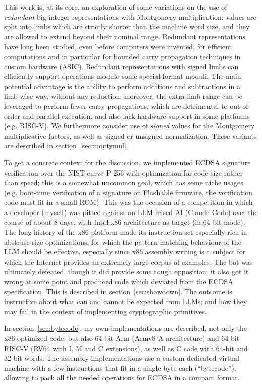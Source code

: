\documentclass{llncs}
\begin{document}
This work is, at its core, an exploration of some variations on the use
of \emph{redundant} big integer representations with Montgomery
multiplication: values are split into limbs which are strictly shorter
than the machine word size, and they are allowed to extend beyond their
nominal range. Redundant representations have long been studied, even
before computers were invented\cite{Col1726}, for efficient
computations\cite{Bri1983,Hon1989} and in particular for bounded carry
propagation techniques in custom hardware (ASIC)\cite{PhaKor1994}.
Redundant representations with signed limbs can efficiently support
operations modulo some special-format moduli\cite{Ber2006}. The main
potential advantage is the ability to perform additions and subtractions
in a limb-wise way, without any reduction; moreover, the extra limb
range can be leveraged to perform fewer carry propagations, which are
detrimental to out-of-order and parallel execution, and also lack
hardware support in some platforms (e.g. RISC-V). We furthermore
consider use of \emph{signed} values for the Montgomery multiplicative
factors, as well as signed or unsigned normalization. These variants are
described in section~\ref{sec:montymul}.

To get a concrete context for the discussion, we implemented ECDSA
signature verification over the NIST curve P-256 with optimization for
code size rather than speed; this is a somewhat uncommon goal, which has
some niche usages (e.g. boot-time verification of a signature on
Flashable firmware, the verification code must fit in a small ROM). This
was the occasion of a competition in which a developer (myself) was
pitted against an LLM-based AI (Claude Code) over the course of about 8
days, with Intel x86 architecture as target (in 64-bit mode). The long
history of the x86 platform made its instruction set especially rich in
abstruse size optimizations, for which the pattern-matching behaviour of
the LLM should be effective, especially since x86 assembly writing is a
subject for which the Internet provides an extremely large corpus of
examples. The bot was ultimately defeated, though it did provide some
tough opposition; it also got it wrong at some point and produced code
which deviated from the ECDSA specification. This is described in
section~\ref{sec:showdown}. The outcome is instructive about what can
and cannot be expected from LLMs, and how they may fail in the context
of implementing cryptographic primitives.

In section~\ref{sec:bytecode}, my own implementations are described, not
only the x86-optimized code, but also 64-bit Arm (Armv8-A architecture)
and 64-bit RISC-V (RV64 with I, M and C extensions), as well as C code
with 64-bit and 32-bit words. The assembly implementations use a custom
dedicated virtual machine with a few instructions that fit in a single
byte each (``bytecode''), allowing to pack all the needed operations for
ECDSA in a compact format.
\end{document}
